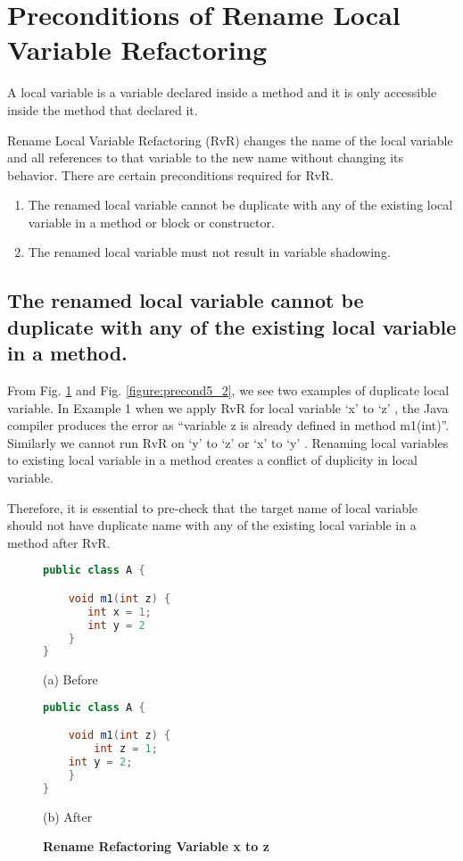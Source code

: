 \section{\textbf{Preconditions of Rename Local Variable Refactoring}}
A local variable is a variable declared inside a method and it is only accessible inside the method that declared it.

Rename Local Variable Refactoring (RvR) changes the name of the local variable and all references to that variable to the new name without changing its behavior. There are certain preconditions required for RvR.
\begin{enumerate}
\item The renamed local variable cannot be duplicate with any of the existing local variable in a method or block or constructor.
\item The renamed local variable must not result in variable shadowing.
\end{enumerate}

\subsection{The renamed local variable cannot be duplicate with any of the existing local variable in a method.}
 
From Fig. \ref{figure:precond5_1} and Fig. \ref{figure:precond5_2}, we see two examples of duplicate local variable. In Example 1 when we apply RvR for local variable `x' to `z' , the Java compiler produces the error as ``variable z is already defined in method m1(int)''. Similarly we cannot run RvR on  `y'  to `z' or `x'  to `y' . Renaming local variables to existing local variable in a method creates a conflict of duplicity in local variable.

Therefore, it is essential to pre-check that the target name of local variable should not have duplicate name with any of the existing local variable in a method after RvR.

\begin{figure}[th]
\centering
\begin{minipage}[t]{0.4\linewidth}
\begin{lstlisting}[language=java, basicstyle=\scriptsize\ttfamily,frame=single]
public class A {

    void m1(int z) {
       int x = 1; 
       int y = 2
    }
}
\end{lstlisting}
\centering(a) Before
\end{minipage}
\hfill
\begin{minipage}[t]{0.4\linewidth}
\begin{lstlisting}[language=java, basicstyle=\scriptsize\ttfamily,frame=single]
public class A {

    void m1(int z) {
        int z = 1; 
	int y = 2;
    }
}
\end{lstlisting}
\centering(b) After 
\end{minipage}
\caption{\textbf{Rename Refactoring Variable x to z}}
\label{figure:precond5_1}
\end{figure}

